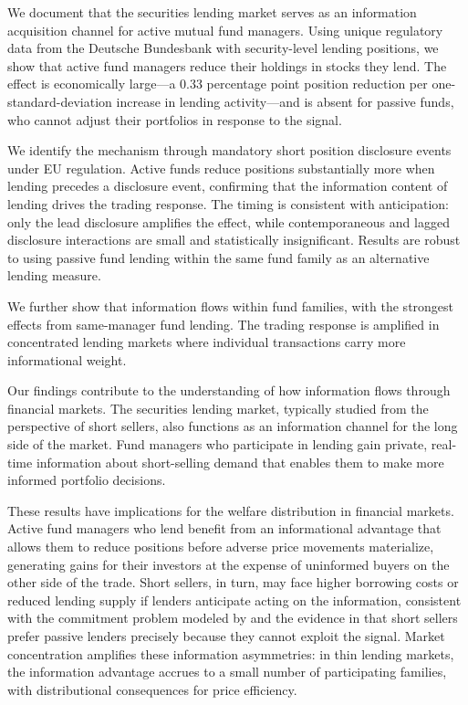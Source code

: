 
We document that the securities lending market serves as an information acquisition channel for active mutual fund managers. Using unique regulatory data from the Deutsche Bundesbank with security-level lending positions, we show that active fund managers reduce their holdings in stocks they lend. The effect is economically large---a 0.33 percentage point position reduction per one-standard-deviation increase in lending activity---and is absent for passive funds, who cannot adjust their portfolios in response to the signal.

We identify the mechanism through mandatory short position disclosure events under EU regulation. Active funds reduce positions substantially more when lending precedes a disclosure event, confirming that the information content of lending drives the trading response. The timing is consistent with anticipation: only the lead disclosure amplifies the effect, while contemporaneous and lagged disclosure interactions are small and statistically insignificant. Results are robust to using passive fund lending within the same fund family as an alternative lending measure.

We further show that information flows within fund families, with the strongest effects from same-manager fund lending. The trading response is amplified in concentrated lending markets where individual transactions carry more informational weight.

Our findings contribute to the understanding of how information flows through financial markets. The securities lending market, typically studied from the perspective of short sellers, also functions as an information channel for the long side of the market. Fund managers who participate in lending gain private, real-time information about short-selling demand that enables them to make more informed portfolio decisions.

These results have implications for the welfare distribution in financial markets. Active fund managers who lend benefit from an informational advantage that allows them to reduce positions before adverse price movements materialize, generating gains for their investors at the expense of uninformed buyers on the other side of the trade. Short sellers, in turn, may face higher borrowing costs or reduced lending supply if lenders anticipate acting on the information, consistent with the commitment problem modeled by \citet{Nurisso2026} and the evidence in \citet{PaliaSokolinski2024} that short sellers prefer passive lenders precisely because they cannot exploit the signal. Market concentration amplifies these information asymmetries: in thin lending markets, the information advantage accrues to a small number of participating families, with distributional consequences for price efficiency.


